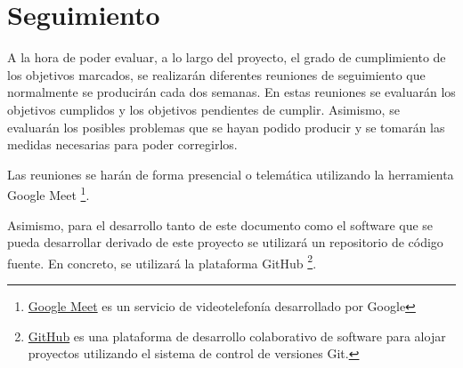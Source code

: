 \section{Seguimiento}
\label{sec:metodologia:seguimiento}


A la hora de poder evaluar, a lo largo del proyecto, el grado de cumplimiento de los objetivos
marcados, se realizarán diferentes reuniones de seguimiento que normalmente se producirán cada
dos semanas. En estas reuniones se evaluarán los objetivos cumplidos y los objetivos pendientes
de cumplir. Asimismo, se evaluarán los posibles problemas que se hayan podido producir y se
tomarán las medidas necesarias para poder corregirlos.

Las reuniones se harán de forma presencial o telemática utilizando la herramienta Google Meet
\footnote{\href{https://meet.google.com/}{Google Meet} es un servicio de videotelefonía desarrollado por Google}.

Asimismo, para el desarrollo tanto de este documento como el software que se pueda desarrollar derivado
de este proyecto se utilizará un repositorio de código fuente. En concreto, se utilizará la plataforma
GitHub \footnote{\href{https://github.com/}{GitHub} es una plataforma de desarrollo colaborativo de software
para alojar proyectos utilizando el sistema de control de versiones Git.}.

